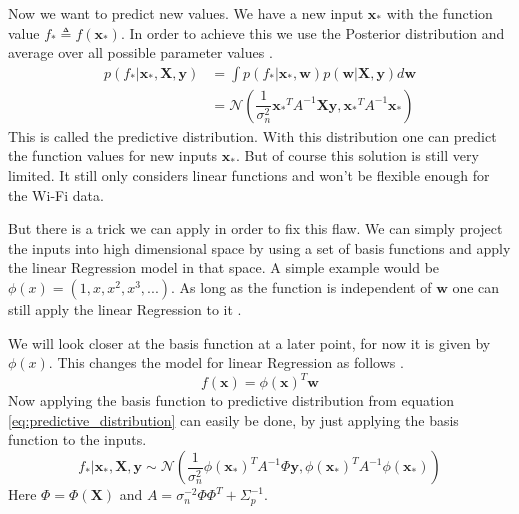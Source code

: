 Now we want to predict new values. We have a new input $\mathbf{x_*}$ with the function value $f_* \triangleq f(\mathbf{x_*})$. In order to achieve this we use the \gls{Posterior} distribution and average over all possible parameter values \citep[p.\ 11]{Rasmussen:2005:GPM:1162254}.
\begin{equation}\label{eq:predictive_distribution}
\begin{aligned}
p(f_*|\mathbf{x_*},\mathbf{X},\mathbf{y}) &= \int p(f_*|\mathbf{x_*},\mathbf{w})p(\mathbf{w}|\mathbf{X},\mathbf{y})d\mathbf{w}\\
&= \mathcal{N}(\dfrac{1}{\sigma_n^2}\mathbf{x_*}^TA^{-1}\mathbf{X}\mathbf{y},\mathbf{x_*}^TA^{-1}\mathbf{x_*})
\end{aligned}
\end{equation}
This is called the predictive distribution. With this distribution one can predict the function values for new inputs $\mathbf{x_*}$. But of course this solution is still very limited. It still only considers linear functions and won't be flexible enough for the Wi-Fi data. 

But there is a trick we can apply in order to fix this flaw. We can simply project the inputs into high dimensional space by using a set of basis functions and apply the linear \gls{Regression} model in that space. A simple example would be $\phi(x) = (1,x,x^2,x^3,...)$. As long as the function is independent of $\mathbf{w}$ one can still apply the linear \gls{Regression} to it \citep[p.\ 11]{Rasmussen:2005:GPM:1162254}.

We will look closer at the basis function at a later point, for now it is given by $\phi(x)$. This changes the model for linear \gls{Regression} as follows \citep[p.\ 12]{Rasmussen:2005:GPM:1162254}.
\begin{equation}\label{eq:basis_function}
f(\mathbf{x}) = \phi(\mathbf{x})^T\mathbf{w}
\end{equation}
Now applying the basis function to predictive distribution from equation \ref{eq:predictive_distribution} can easily be done, by just applying the basis function to the inputs. 
\begin{equation}\label{eq:prediction_distri_basis_function}
f_*|\mathbf{x_*},\mathbf{X},\mathbf{y} \sim \mathcal{N}(\dfrac{1}{\sigma_n^2}\phi(\mathbf{x_*})^TA^{-1}\Phi\mathbf{y}, \phi(\mathbf{x_*})^TA^{-1}\phi(\mathbf{x_*}))
\end{equation}
Here $\Phi = \Phi(\mathbf{X})$ and $A = \sigma_n^{-2}\Phi\Phi^T+\Sigma_p^{-1}$.

